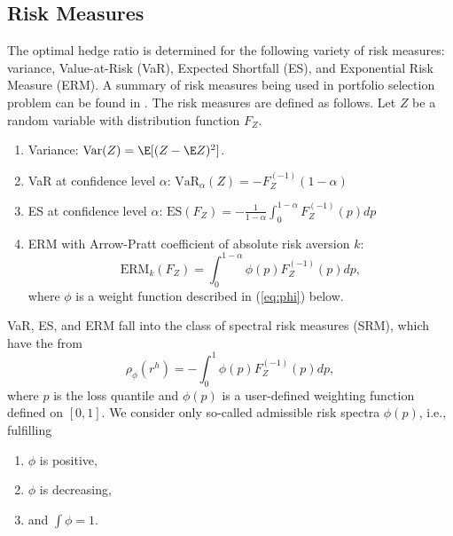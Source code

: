 \subsection{Risk Measures}\label{subsec:spectral-risk-measures}

The optimal hedge ratio is determined for the following variety of risk measures: variance, Value-at-Risk (VaR), Expected Shortfall (ES), and Exponential Risk Measure (ERM).
A summary of risk measures being used in portfolio selection problem
can be found in \citet{hardle2008applied}.
The risk measures are defined as follows.
Let $Z$ be a random
variable with distribution function $F_Z$.
\begin{enumerate}
\item Variance: $\text{Var}(Z) = \E[(Z-\E Z)^2]$. 
\item VaR at confidence level $\alpha$: $\text{VaR}_\alpha(Z) = -F_{Z}^{(-1)}(1-\alpha)$
\item ES at confidence level $\alpha$: $\text{ES}(F_Z) = -\frac{1}{1-\alpha}\int_0^{1-\alpha}F_Z^{(-1)}(p)dp$
\item ERM with Arrow-Pratt coefficient of absolute risk
  aversion $k$:
  \begin{equation*}
    \text{ERM}_k(F_Z) = \int_0^{1-\alpha}\phi(p) F_Z^{(-1)}(p)dp,
  \end{equation*}
  where $\phi$ is a weight function described in (\ref{eq:phi}) below.
\end{enumerate}

VaR, ES, and ERM fall into the class of spectral risk measures (SRM),
which have the from \citep{Acerbi2002}%
\begin{equation*}
  \rho_\phi(r^h) = - \int_0^1 \phi(p) F_{Z}^{(-1)}(p)d p,
\end{equation*}
where $p$ is the loss quantile and $\phi(p)$ is a user-defined
weighting function defined on $[0,1]$.
We consider only so-called admissible risk spectra $\phi(p)$, i.e.,
fulfilling %
\begin{enumerate}[label=(\roman*)]
\item $\phi$ is positive,
\item $\phi$ is decreasing,
\item and $\int\phi=1$. 
\end{enumerate}

